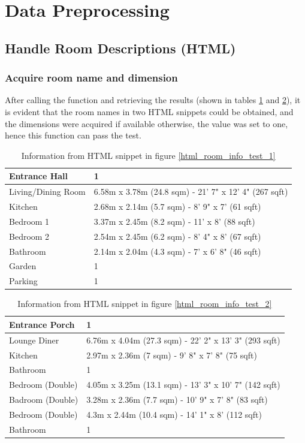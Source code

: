 \documentclass[12pt,twoside]{report}
\begin{document}
\section{Data Preprocessing}

\subsection{Handle Room Descriptions (HTML)}
\subsubsection{Acquire room name and dimension}
After calling the function and retrieving the results (shown in tables \ref{html_room_info_expect_1} and \ref{html_room_info_expect_2}), it is evident that the room names in two HTML snippets could be obtained, and the dimensions were acquired if available otherwise, the value was set to one, hence this function can pass the test.
\begin{table}[h]
	\centering
	\caption{Information from HTML snippet in figure \ref{html_room_info_test_1}}
	\begin{tabular} {| l | l |}
		\hline
		Entrance Hall & 1\\
		\hline
		Living/Dining Room & 6.58m x 3.78m (24.8 sqm) - 21' 7" x 12' 4" (267 sqft)\\
		\hline
		Kitchen & 2.68m x 2.14m (5.7 sqm) - 8' 9" x 7' (61 sqft)\\
		\hline
		Bedroom 1 & 3.37m x 2.45m (8.2 sqm) - 11' x 8' (88 sqft)\\
		\hline
		Bedroom 2 & 2.54m x 2.45m (6.2 sqm) - 8' 4" x 8' (67 sqft)\\
		\hline 
		Bathroom & 2.14m x 2.04m (4.3 sqm) - 7' x 6' 8" (46 sqft)\\
		\hline
		Garden & 1\\
		\hline
		Parking & 1\\
		\hline
	\end{tabular}
	\label{html_room_info_expect_1}
\end{table}

\begin{table}[h]
	\centering
	\caption{Information from HTML snippet in figure \ref*{html_room_info_test_2}}
	\begin{tabular} {| l | l |}
		\hline
		Entrance Porch & 1\\
		\hline
		Lounge Diner & 6.76m x 4.04m (27.3 sqm) - 22' 2" x 13' 3" (293 sqft)\\
		\hline
		Kitchen & 2.97m x 2.36m (7 sqm) - 9' 8" x 7' 8" (75 sqft)\\
		\hline
		Bathroom & 1\\
		\hline
		Bedroom (Double) & 4.05m x 3.25m (13.1 sqm) - 13' 3" x 10' 7" (142 sqft)\\
		\hline 
		Badroom (Double) & 3.28m x 2.36m (7.7 sqm) - 10' 9" x 7' 8" (83 sqft)\\
		\hline
		Bedroom (Double) & 4.3m x 2.44m (10.4 sqm) - 14' 1" x 8' (112 sqft)\\
		\hline
		Bathroom & 1\\
		\hline
	\end{tabular}
	\label{html_room_info_expect_2}
\end{table}
\end{document}
